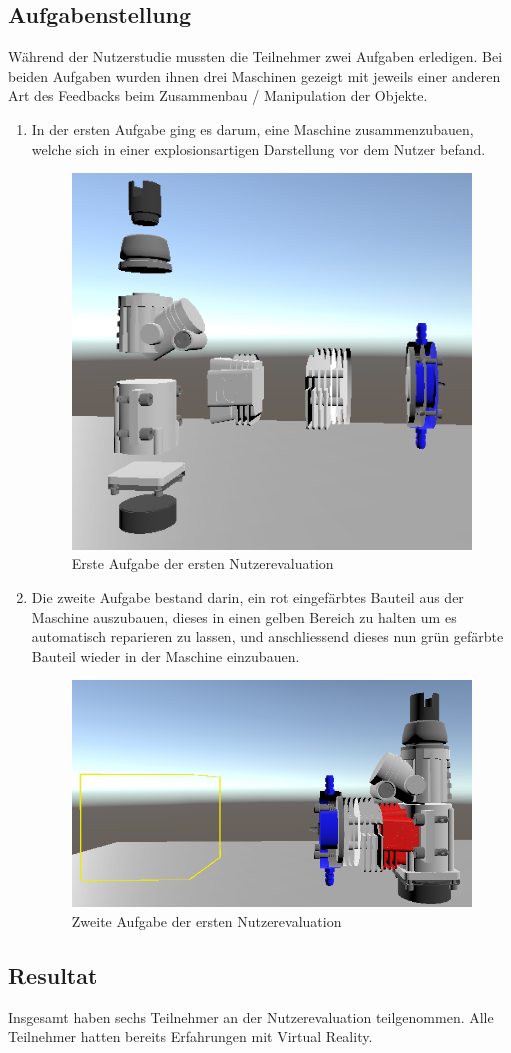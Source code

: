 \subsection{Aufgabenstellung}
Während der Nutzerstudie mussten die Teilnehmer zwei Aufgaben erledigen. Bei beiden Aufgaben wurden ihnen drei Maschinen gezeigt mit jeweils einer anderen Art des Feedbacks beim Zusammenbau / Manipulation der Objekte.
\begin{enumerate}
	\item In der ersten Aufgabe ging es darum, eine Maschine zusammenzubauen, welche sich in einer explosionsartigen Darstellung vor dem Nutzer befand. 
	
	\begin{figure}[h!]
		\centering
		\includegraphics[keepaspectratio,width=0.28\linewidth]{img/Evaluation_Task1.PNG}
		\caption{Erste Aufgabe der ersten Nutzerevaluation}
		\label{fig:evaluation1_task1}
	\end{figure}
	
	\item Die zweite Aufgabe bestand darin, ein rot eingefärbtes Bauteil aus der Maschine auszubauen, dieses in einen gelben Bereich zu halten um es automatisch reparieren zu lassen, und anschliessend dieses nun grün gefärbte Bauteil wieder in der Maschine einzubauen.
	
	\begin{figure}[h!]
		\centering
		\includegraphics[keepaspectratio,width=0.34\linewidth]{img/Evaluation_Task2.PNG}
		\caption{Zweite Aufgabe der ersten Nutzerevaluation}
		\label{fig:evaluation1_task2}
	\end{figure}
	
\end{enumerate}

\pagebreak
\subsection{Resultat}
Insgesamt haben sechs Teilnehmer an der Nutzerevaluation teilgenommen. Alle Teilnehmer hatten bereits Erfahrungen mit Virtual Reality. \\

